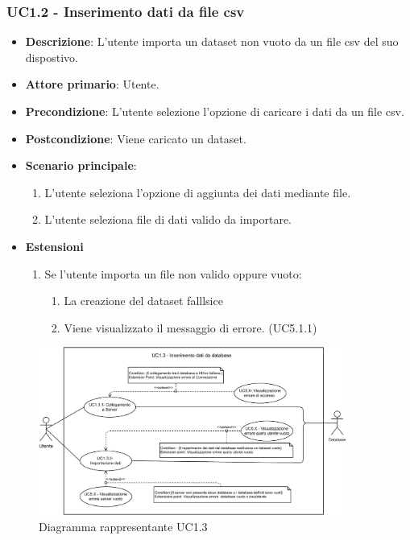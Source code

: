\subsubsection{UC1.2 - Inserimento dati da file csv}
\label{ssub:UC1.1.1}
\begin{itemize}
    \item \textbf{Descrizione}: L'utente importa un dataset non vuoto da un file csv del suo dispostivo.

    \item \textbf{Attore primario}: Utente.
    
    \item \textbf{Precondizione}:   L'utente selezione l'opzione di caricare i dati da un file csv.
    \item \textbf{Postcondizione}:  Viene caricato un dataset. 

	\item \textbf{Scenario principale}:
		\begin{enumerate}
			\item L'utente seleziona l'opzione di aggiunta dei dati mediante file.
			\item L'utente seleziona file di dati valido da importare.
        \end{enumerate}
     
    \item \textbf{Estensioni}
    \begin{enumerate}
    
        \item Se l'utente importa un file non valido oppure vuoto:
        \begin{enumerate}
            \item La creazione del dataset falllsice
            \item Viene visualizzato il messaggio di errore. (UC5.1.1)
        \end{enumerate}
    \end{enumerate}
\end{itemize}

\newpage
\begin{figure}[h]
    \centering
    \includegraphics[width=0.9\textwidth]{componenti/casi-duso/diagrammi/UC1.3.pdf}
    \caption{Diagramma rappresentante UC1.3}
    \label{fig:UC1.3}
\end{figure}


